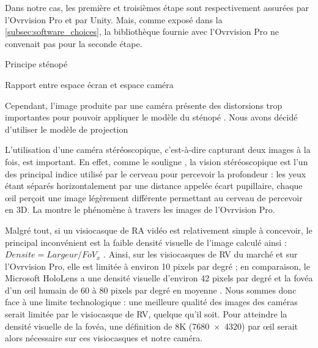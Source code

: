 Dans notre cas, les première et troisièmes étape sont respectivement assurées par l'Ovrvision Pro et par Unity. Mais, comme exposé dans la \autoref{subsec:software_choices}, la bibliothèque fournie avec l'Ovrvision Pro ne convenait pas pour la seconde étape.

Principe sténopé

Rapport entre espace écran et espace caméra

Cependant, l'image produite par une caméra  présente des distorsions trop importantes pour pouvoir appliquer le modèle du sténopé . Nous avons décidé d'utiliser le modèle de projection 

L'utilisation d'une caméra stéréoscopique, c'est-à-dire capturant deux images à la fois, est important. En effet, comme le souligne \cite{Bourke1999}, la vision stéréoscopique est l'un des principal indice utilisé par le cerveau pour percevoir la profondeur : les yeux étant séparés horizontalement par une distance appelée écart pupillaire, chaque \oe il perçoit une image légèrement différente permettant au cerveau de percevoir en 3D. La  montre le phénomène à travers les images de l'Ovrvision Pro.


Malgré tout, si un visiocasque de RA vidéo est relativement simple à concevoir, le principal inconvénient est la faible densité visuelle de l'image calculé ainsi : $Densite = Largeur / FoV_x$ \citep{Boger2017}. Ainsi, sur les visiocasques de RV du marché et sur l'Ovrvision Pro, elle est limitée à environ 10 pixels par degré  ; en comparaison, le Microsoft HoloLens a une densité visuelle d'environ 42 pixels par degré et la fovéa d'un \oe il humain de 60 à 80 pixels par degré en moyenne \citep{Kistner2014}. Nous sommes donc face à une limite technologique : une meilleure qualité des images des caméras serait limitée par le visiocasque de RV, quelque qu'il soit. Pour atteindre la densité visuelle de la fovéa, une définition de 8K (\SI{7680x4320}{\px}) par \oe il serait alors nécessaire sur ces visiocasques et notre caméra.

